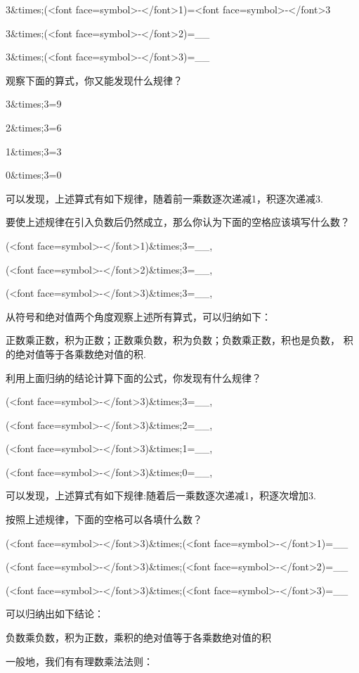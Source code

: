 3&times;(<font face=symbol>-</font>1)=<font face=symbol>-</font>3

3&times;(<font face=symbol>-</font>2)=__

3&times;(<font face=symbol>-</font>3)=__

\beginexample

观察下面的算式，你又能发现什么规律？

3&times;3=9

2&times;3=6

1&times;3=3

0&times;3=0

\endexample

可以发现，上述算式有如下规律，随着前一乘数逐次递减1，积逐次递减3.

要使上述规律在引入负数后仍然成立，那么你认为下面的空格应该填写什么数？

(<font face=symbol>-</font>1)&times;3=__,

(<font face=symbol>-</font>2)&times;3=__,

(<font face=symbol>-</font>3)&times;3=__,

从符号和绝对值两个角度观察上述所有算式，可以归纳如下：

正数乘正数，积为正数；正数乘负数，积为负数；负数乘正数，积也是负数，
积的绝对值等于各乘数绝对值的积.

\beginexample

利用上面归纳的结论计算下面的公式，你发现有什么规律？

(<font face=symbol>-</font>3)&times;3=__,

(<font face=symbol>-</font>3)&times;2=__,

(<font face=symbol>-</font>3)&times;1=__,

(<font face=symbol>-</font>3)&times;0=__,

\endexample

可以发现，上述算式有如下规律:随着后一乘数逐次递减1，积逐次增加3.

按照上述规律，下面的空格可以各填什么数？

(<font face=symbol>-</font>3)&times;(<font face=symbol>-</font>1)=__

(<font face=symbol>-</font>3)&times;(<font face=symbol>-</font>2)=__

(<font face=symbol>-</font>3)&times;(<font face=symbol>-</font>3)=__

可以归纳出如下结论：

负数乘负数，积为正数，乘积的绝对值等于各乘数绝对值的积

一般地，我们有有理数乘法法则：

